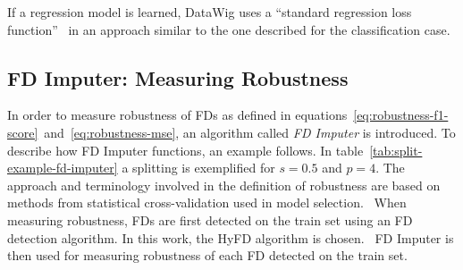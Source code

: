 If a regression model is learned, DataWig uses a ``standard regression loss function''~\cite[p.~2025]{BIE18} in an approach similar to the one described for the classification case.

\subsection{FD Imputer: Measuring Robustness}
In order to measure robustness of FDs as defined in equations~\ref{eq:robustness-f1-score}~and~\ref{eq:robustness-mse}, an algorithm called \emph{FD Imputer} is introduced.
To describe how FD Imputer functions, an example follows.
In table~\ref{tab:split-example-fd-imputer} a splitting is exemplified for \( s = 0.5 \) and \( p=4 \).
The approach and terminology involved in the definition of robustness are based on methods from statistical cross-validation used in model selection.~\cite[p.~172]{HAY08}
When measuring robustness, FDs are first detected on the train set using an FD detection algorithm.
In this work, the HyFD algorithm is chosen.~\cite{PAP16}
FD Imputer is then used for measuring robustness of each FD detected on the train set.

